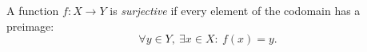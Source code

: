 
A function $f:X\to Y$ is \emph{surjective} if every element of the codomain has a preimage:
\[
\forall y\in Y,\ \exists x\in X:\ f(x)=y.
\]
